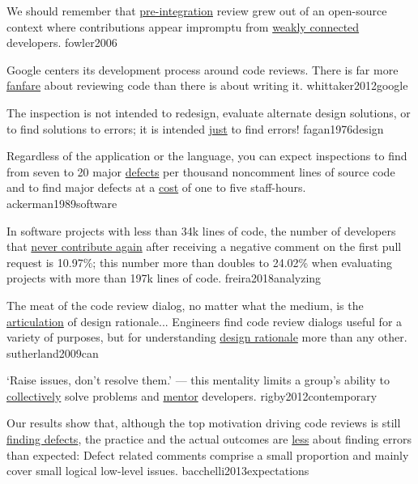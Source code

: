 \documentclass{article}
\begin{document}

  {We should remember that \ul{pre-integration} review grew out of an open-source context where contributions appear impromptu from \ul{weakly connected} developers.}
  {fowler2006}

  {Google centers its development process around code reviews. There is far more \ul{fanfare} about reviewing code than there is about writing it.}
  {whittaker2012google}


  {The inspection is not intended to redesign, evaluate alternate design solutions, or to find solutions to errors; it is intended \ul{just} to find errors!}
  {fagan1976design}

  {Regardless of the application or the language, you can expect inspections to find from seven to 20 major \ul{defects} per thousand noncomment lines of source code and to find major defects at a \ul{cost} of one to five staff-hours.}
  {ackerman1989software}

  {In software projects with less than 34k lines of code, the number of developers that \ul{never contribute again} after receiving a negative comment on the first pull request is 10.97\%; this number more than doubles to 24.02\% when evaluating projects with more than 197k lines of code.}
  {freira2018analyzing}


  {The meat of the code review dialog, no matter what the medium, is the \ul{articulation} of design rationale... Engineers find code review dialogs useful for a variety of purposes, but for understanding \ul{design rationale} more than any other.}
  {sutherland2009can}

  {`Raise issues, don't resolve them.' --- this mentality limits a group's ability to \ul{collectively} solve problems and \ul{mentor} developers.}
  {rigby2012contemporary}

  {Our results show that, although the top motivation driving code reviews is still \ul{finding defects}, the practice and the actual outcomes are \ul{less} about finding errors than expected: Defect related comments comprise a small proportion and mainly cover small logical low-level issues.}
  {bacchelli2013expectations}
\end{document}
